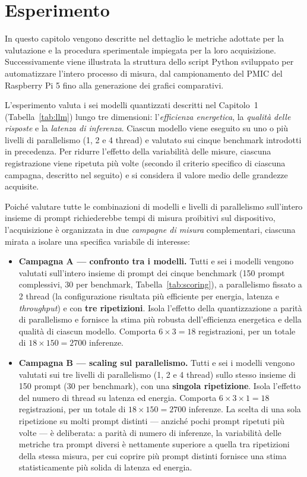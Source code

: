 \chapter{Esperimento}

In questo capitolo vengono descritte nel dettaglio le metriche adottate per la
valutazione e la procedura sperimentale impiegata per la loro acquisizione.
Successivamente viene illustrata la struttura dello script Python sviluppato per
automatizzare l'intero processo di misura, dal campionamento del PMIC del
Raspberry Pi 5 fino alla generazione dei grafici comparativi.

L'esperimento valuta i sei modelli quantizzati descritti nel Capitolo~1
(Tabella~\ref{tab:llm}) lungo tre dimensioni: l'\textit{efficienza energetica},
la \textit{qualità delle risposte} e la \textit{latenza di inferenza}. Ciascun
modello viene eseguito su uno o più livelli di parallelismo (1, 2 e 4 thread) e
valutato sui cinque benchmark introdotti in precedenza. Per ridurre l'effetto
della variabilità delle misure, ciascuna registrazione viene ripetuta più volte
(secondo il criterio specifico di ciascuna campagna, descritto nel seguito) e si
considera il valore medio delle grandezze acquisite.

Poiché valutare tutte le combinazioni di modelli e livelli di parallelismo
sull'intero insieme di prompt richiederebbe tempi di misura proibitivi sul
dispositivo, l'acquisizione è organizzata in due \emph{campagne di misura}
complementari, ciascuna mirata a isolare una specifica variabile di interesse:

\begin{itemize}
    \item \textbf{Campagna A --- confronto tra i modelli.} Tutti e sei i modelli
    vengono valutati sull'intero insieme di prompt dei cinque benchmark
    (150 prompt complessivi, 30 per benchmark, Tabella~\ref{tab:scoring}), a
    parallelismo fissato a 2 thread (la configurazione risultata più efficiente per
    energia, latenza e \textit{throughput}) e con \textbf{tre ripetizioni}. Isola
    l'effetto della quantizzazione a parità di parallelismo e fornisce la stima più
    robusta dell'efficienza energetica e della qualità di ciascun modello. Comporta
    $6 \times 3 = 18$ registrazioni, per un totale di $18 \times 150 = 2700$
    inferenze.

    \item \textbf{Campagna B --- scaling sul parallelismo.} Tutti e sei i modelli
    vengono valutati sui tre livelli di parallelismo (1, 2 e 4 thread) sullo stesso
    insieme di 150 prompt (30 per benchmark), con una \textbf{singola ripetizione}.
    Isola l'effetto del numero di thread su latenza ed energia. Comporta
    $6 \times 3 \times 1 = 18$ registrazioni, per un totale di $18 \times 150 = 2700$
    inferenze. La scelta di una sola ripetizione su molti prompt distinti --- anziché
    pochi prompt ripetuti più volte --- è deliberata: a parità di numero di inferenze,
    la variabilità delle metriche tra prompt diversi è nettamente superiore a quella
    tra ripetizioni della stessa misura, per cui coprire più prompt distinti fornisce
    una stima statisticamente più solida di latenza ed energia.
\end{itemize}

